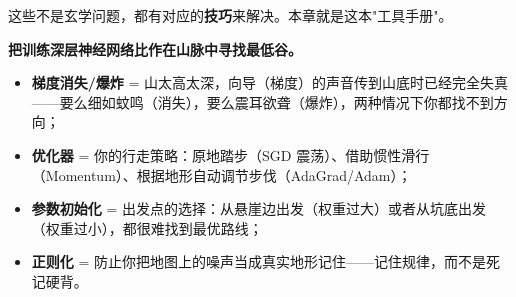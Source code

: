 \documentclass[a4paper,11pt]{ctexart}
\begin{document}
这些不是玄学问题，都有对应的\textbf{技巧}来解决。本章就是这本"工具手册"。

\begin{metaphorbox}
    \textbf{把训练深层神经网络比作在山脉中寻找最低谷。}

    \begin{itemize}
        \item \textbf{梯度消失/爆炸} = 山太高太深，向导（梯度）的声音传到山底时已经完全失真——要么细如蚊鸣（消失），要么震耳欲聋（爆炸），两种情况下你都找不到方向；
        \item \textbf{优化器} = 你的行走策略：原地踏步（SGD 震荡）、借助惯性滑行（Momentum）、根据地形自动调节步伐（AdaGrad/Adam）；
        \item \textbf{参数初始化} = 出发点的选择：从悬崖边出发（权重过大）或者从坑底出发（权重过小），都很难找到最优路线；
        \item \textbf{正则化} = 防止你把地图上的噪声当成真实地形记住——记住规律，而不是死记硬背。
    \end{itemize}
\end{metaphorbox}
\end{document}
